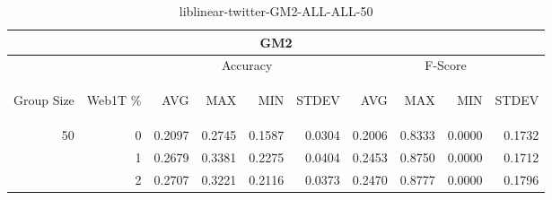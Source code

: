 \begin{center}
\begin{table}[htbp] 
 \begin{center}
\begin{tabular}{ | r | r | r | r | r | r | r | r | r | r |}
\hline
\multicolumn{10}{|c|}{GM2}\\
\hline
 & & \multicolumn{4}{|c|}{Accuracy} & \multicolumn{4}{|c|}{F-Score}\\ \cline{3-10}
\begin{sideways}Group Size\end{sideways} & \begin{sideways}Web1T \%\end{sideways} & \begin{sideways}AVG\end{sideways} & \begin{sideways}MAX\end{sideways} & \begin{sideways}MIN\end{sideways} & \begin{sideways}STDEV\end{sideways} & \begin{sideways}AVG\end{sideways} & \begin{sideways}MAX\end{sideways} & \begin{sideways}MIN\end{sideways} & \begin{sideways}STDEV\end{sideways}\\
\hline
\multirow{2}{*}{50}
 & 0 & 0.2097 & 0.2745 & 0.1587 & 0.0304 & 0.2006 & 0.8333 & 0.0000 & 0.1732\\ \cline{2-10}
 & 1 & 0.2679 & 0.3381 & 0.2275 & 0.0404 & 0.2453 & 0.8750 & 0.0000 & 0.1712\\ \cline{2-10}
 & 2 & 0.2707 & 0.3221 & 0.2116 & 0.0373 & 0.2470 & 0.8777 & 0.0000 & 0.1796\\ \cline{2-10}
\hline
\end{tabular}
\caption{liblinear-twitter-GM2-ALL-ALL-50}
\label{table:liblinear-twitter-GM2-ALL-ALL-50}
\end{center}
 \end{table}
\end{center}

